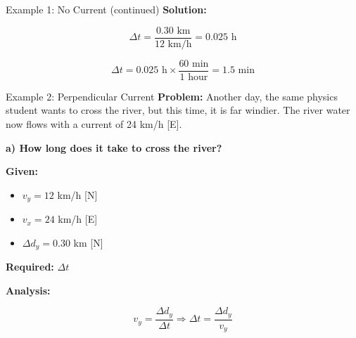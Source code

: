 \documentclass{beamer}
\begin{document}
\begin{frame}{Example 1: No Current (continued)}
\textbf{Solution:}
 
\[\Delta t = \frac{0.30 \text{ km}}{12 \text{ km/h}} = 0.025 \text{ h}\]
 
\[\Delta t = 0.025 \text{ h} \times \frac{60 \text{ min}}{1 \text{ hour}} = 1.5 \text{ min}\]
 

\vspace{0.5cm}
\begin{center}
\end{center}
\end{frame}

\begin{frame}{Example 2: Perpendicular Current}
\textbf{Problem:} Another day, the same physics student wants to cross the river, but this time, it is far windier. The river water now flows with a current of 24 km/h [E].
 
\vspace{0.3cm}

\textbf{a) How long does it take to cross the river?}
 
\vspace{0.3cm}

\textbf{Given:}
\begin{itemize}
\item \(v_y = 12\) km/h [N]
\item \(v_x = 24\) km/h [E]
\item \(\Delta d_y = 0.30\) km [N]
\end{itemize}
 

\textbf{Required:} \(\Delta t\)
 
\vspace{0.3cm}

\textbf{Analysis:} 
 
\[v_y = \frac{\Delta d_y}{\Delta t} \Rightarrow \Delta t = \frac{\Delta d_y}{v_y}\]
\end{frame}
\end{document}
